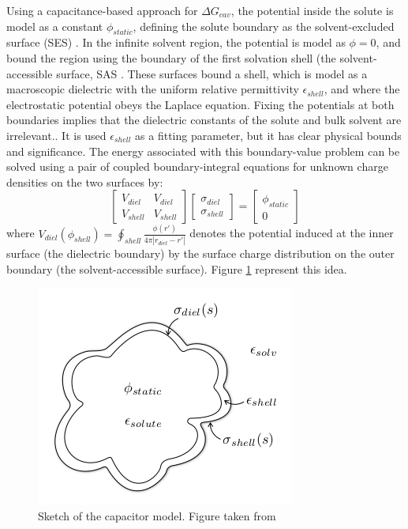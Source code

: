 Using a capacitance-based approach for $\Delta G_{cav}$, the potential inside the solute is model as a constant $\phi_{static}$, defining the solute boundary as the solvent-excluded surface (SES) \cite{connolly1983analytical}. In the infinite solvent region, the potential is model as $\phi=0$, and bound the region using the boundary of the first solvation shell (the solvent-accessible surface, SAS \cite{connolly1983analytical}. These surfaces bound a shell, which is model as a macroscopic dielectric with the uniform relative permittivity $\epsilon_{shell}$, and where the electrostatic potential obeys the Laplace equation. Fixing the potentials at both boundaries implies that the dielectric constants of the solute and bulk solvent are irrelevant.. It is used $\epsilon_{shell}$ as a fitting parameter, but it has clear physical bounds and significance. The energy associated with this boundary-value problem can be solved using a pair of coupled boundary-integral equations for unknown charge densities on the two surfaces by: 
\begin{equation}
    \begin{bmatrix}
V_{diel} & V_{diel}\\ 
 V_{shell}& V_{shell}
\end{bmatrix}\begin{bmatrix}
\sigma_{diel}\\ 
\sigma_{shell}
\end{bmatrix}
=
\begin{bmatrix}
\phi_{static}\\ 
0
\end{bmatrix}
\end{equation}
where $V_{diel}(\phi_{shell})=\oint_{shell}\frac{\phi(r')}{4\pi\left |r_{diel}-r' \right |}$ denotes the potential induced at the inner surface (the dielectric boundary) by the surface charge distribution on the outer boundary (the solvent-accessible surface). Figure \ref{fig:capacitor} represent this idea. 
\begin{figure}[h]
    \centering
    \includegraphics[scale=0.5]{Figures/Chapter 4/capacitor_model.png}
    \caption{Sketch of the capacitor model. Figure taken from \cite{cooper2020simple}}
    \label{fig:capacitor}
\end{figure}
